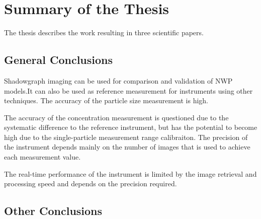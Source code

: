 \chapter{Summary of the Thesis}
\label{chap:summary}

The thesis describes the work resulting in three scientific papers.

\section{General Conclusions}

Shadowgraph imaging can be used for comparison and validation of NWP models.It can also be used as reference measurement for instruments using other techniques. The accuracy of the particle size measurement is high. 

The accuracy of the concentration measurement is questioned due to the systematic difference to the reference instrument, but has the potential to become high due to the single-particle measurement range calibraiton. The precision of the instrument depends mainly on the number of images that is used to achieve each measurement value. 

The real-time performance of the instrument is limited by the image retrieval and processing speed and depends on the precision required.

\section{Other Conclusions}

